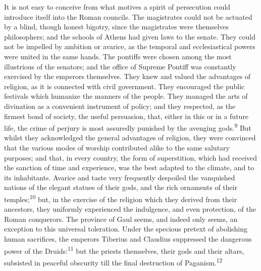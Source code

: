 It is not easy to conceive from what motives a spirit of
persecution could introduce itself into the Roman councils. The
magistrates could not be actuated by a blind, though honest
bigotry, since the magistrates were themselves philosophers; and
the schools of Athens had given laws to the senate. They could
not be impelled by ambition or avarice, as the temporal and
ecclesiastical powers were united in the same hands. The pontiffs
were chosen among the most illustrious of the senators; and the
office of Supreme Pontiff was constantly exercised by the
emperors themselves. They knew and valued the advantages of
religion, as it is connected with civil government. They
encouraged the public festivals which humanize the manners of the
people. They managed the arts of divination as a convenient
instrument of policy; and they respected, as the firmest bond of
society, the useful persuasion, that, either in this or in a
future life, the crime of perjury is most assuredly punished by
the avenging gods.\textsuperscript{9} But whilst they acknowledged the general
advantages of religion, they were convinced that the various
modes of worship contributed alike to the same salutary purposes;
and that, in every country, the form of superstition, which had
received the sanction of time and experience, was the best
adapted to the climate, and to its inhabitants. Avarice and taste
very frequently despoiled the vanquished nations of the elegant
statues of their gods, and the rich ornaments of their temples;\textsuperscript{10}
but, in the exercise of the religion which they derived from
their ancestors, they uniformly experienced the indulgence, and
even protection, of the Roman conquerors. The province of Gaul
seems, and indeed only seems, an exception to this universal
toleration. Under the specious pretext of abolishing human
sacrifices, the emperors Tiberius and Claudius suppressed the
dangerous power of the Druids:\textsuperscript{11} but the priests themselves,
their gods and their altars, subsisted in peaceful obscurity till
the final destruction of Paganism.\textsuperscript{12}




